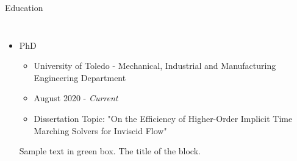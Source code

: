 \begin{frame}{Education}
\begin{columns}
        \begin{itemize}
        \item PhD  
        \begin{itemize}
          \item University of Toledo - Mechanical, Industrial and Manufacturing Engineering Department
          \item August 2020 - \textit{Current}
          \item Dissertation Topic: "On the Efficiency of Higher-Order Implicit Time Marching Solvers for Inviscid Flow"
        \end{itemize}
          \begin{examples}
            Sample text in green box. The title of the block.
          \end{examples}
        \end{itemize}   
    \end{columns}
\end{frame}

